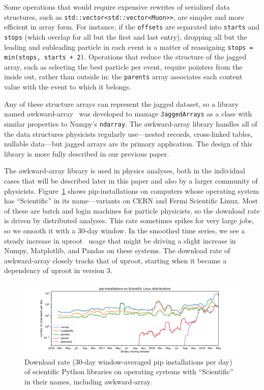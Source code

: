 \documentclass[a4paper]{jpconf}
\begin{document}
Some operations that would require expensive rewrites of serialized data structures, such as {\tt std::vector<std::vector<Muon>>}, are simpler and more efficient in array form. For instance, if the {\tt offsets} are separated into {\tt starts} and {\tt stops} (which overlap for all but the first and last entry), dropping all but the leading and subleading particle in each event is a matter of reassigning {\tt stops = min(stops, starts + 2)}. Operations that reduce the structure of the jagged array, such as selecting the best particle per event, require pointers from the inside out, rather than outside in: the {\tt parents} array associates each content value with the event to which it belongs.

Any of these structure arrays can represent the jagged dataset, so a library named awkward-array~\cite{awkward} was developed to manage {\tt JaggedArrays} as a class with similar properties to Numpy's {\tt ndarray}. The awkward-array library handles all of the data structures physicists regularly use---nested records, cross-linked tables, nullable data---but jagged arrays are its primary application. The design of this library is more fully described in our previous paper\cite{2019EPJWC}.

The awkward-array library is used in physics analyses, both in the individual cases that will be described later in this paper and also by a larger community of physicists. Figure~\ref{fig:uproot} shows pip-installations on computers whose operating system has ``Scientific'' in its name---variants on CERN and Fermi Scientific Linux. Most of these are batch and login machines for particle physicists, so the download rate is driven by distributed analyses. This rate sometimes spikes for very large jobs, so we smooth it with a 30-day window. In the smoothed time series, we see a steady increase in uproot~\cite{uproot} usage that might be driving a slight increase in Numpy, Matplotlib, and Pandas on these systems. The download rate of awkward-array closely tracks that of uproot, starting when it became a dependency of uproot in version 3.

\begin{figure}
\includegraphics[width=\linewidth]{pip-scientificlinux-uproot.pdf}

\caption{Download rate (30-day window-averaged pip installations per day) of scientific Python libraries on operating systems with ``Scientific'' in their names, including awkward-array. \label{fig:uproot}}
\end{figure}
\end{document}
